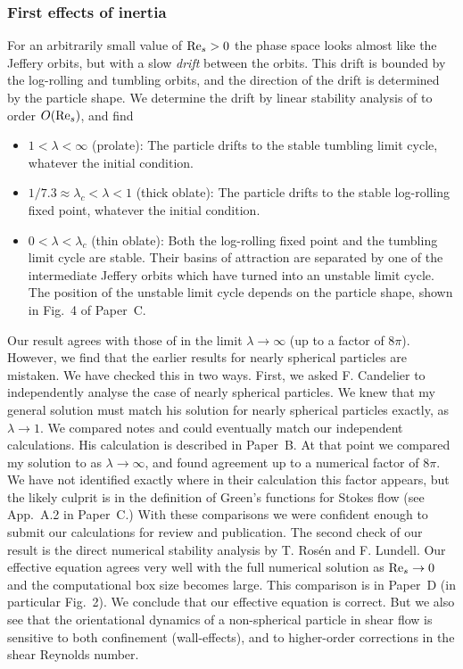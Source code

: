 \documentclass[thesis.tex]{subfiles}
\begin{document}
\subsubsection*{First effects of inertia}
For an arbitrarily small value of $\textrm{Re}_s>0$ the phase space looks almost like the Jeffery orbits, but with a slow \emph{drift} between the orbits. This drift is bounded by the log-rolling and tumbling orbits, and the direction of the drift is determined by the particle shape. We determine the drift by linear stability analysis of  to order $O(\textrm{Re}_s)$, and find 
\begin{itemize}
    \item $1 < \lambda < \infty$ (prolate): The particle drifts to the stable tumbling limit cycle, whatever the initial condition.
    \item $1/7.3\approx\lambda_c < \lambda < 1$ (thick oblate): The particle drifts to the stable log-rolling fixed point, whatever the initial condition.
    \item $0 < \lambda < \lambda_c$ (thin oblate): Both the log-rolling fixed point and the tumbling limit cycle are stable. Their basins of attraction are separated by one of the intermediate Jeffery orbits which have turned into an unstable limit cycle. The position of the unstable limit cycle depends on the particle shape, shown in Fig.~4 of Paper~C. 
\end{itemize}
Our result  agrees with those of \citet{subramanian2005} in the limit $\lambda\to\infty$ (up to a factor of $8\pi$). However, we find that the earlier results for nearly spherical particles \cite{saffman1956,subramanian2006} are mistaken. We have checked this in two ways. First, we asked F. Candelier to independently analyse the case of nearly spherical particles. We knew that my general solution must match his solution for nearly spherical particles exactly, as $\lambda\to1$. We compared notes and could eventually match our independent calculations. His calculation is described in Paper~B. At that point we compared my solution to \citet{subramanian2005} as $\lambda\to\infty$, and found agreement up to a numerical factor of $8\pi$. We have not identified exactly where in their calculation this factor appears, but the likely culprit is in the definition of Green's functions for Stokes flow (see App.~A.2 in Paper~C.) With these comparisons we were confident enough to submit our calculations for review and publication. The second check of our result is the direct numerical stability analysis by T. Ros\'en and F. Lundell. Our effective equation  agrees very well with the full numerical solution as $\textrm{Re}_s\to0$ and the computational box size becomes large. This comparison is in Paper~D (in particular Fig.~2). We conclude that our effective equation is correct. But we also see that the orientational dynamics of a non-spherical particle in shear flow is sensitive to both confinement (wall-effects), and to higher-order corrections in the shear Reynolds number.
\end{document}
